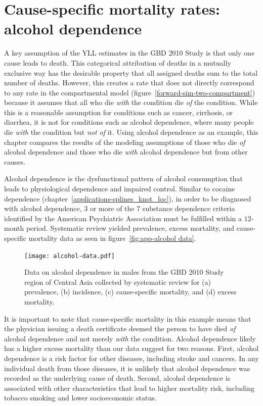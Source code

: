 \chapter{Cause-specific mortality rates: alcohol dependence}
\label{applications-csmr}

A key assumption of the YLL estimates in the GBD 2010 Study is that only
one cause leads to death.  This categorical attribution of deaths in
a mutually exclusive way has the desirable property that all assigned
deaths sum to the total number of deaths.  However, this
creates a rate that does not directly correspond to any rate in the
compartmental model (figure~\ref{forward-sim-two-compartment}) because it
assumes that all who die \emph{with} the condition die \emph{of} the
condition.  While this is a reasonable assumption for conditions
such as cancer, cirrhosis, or diarrhea, it is not for conditions such as
alcohol dependence, where many people die \emph{with}
the condition but \emph{not of} it.  Using alcohol dependence as an
example, this chapter compares the results of
the modeling assumptions of those who die \emph{of} alcohol dependence
and those who die \emph{with} alcohol dependence but from other causes.

Alcohol dependence is the dysfunctional pattern of alcohol consumption
that leads to physiological dependence and impaired control.  Similar to
cocaine dependence (chapter~\ref{applications-splines_knot_loc}), in order to
be diagnosed with alcohol dependence, $3$ or more of the $7$
substance dependence criteria identified by the American Psychiatric
Association must be
fulfilled within a $12$-month period.
\cite{american_psychiatric_association_diagnostic_2000, hasin_prevalence_2007}
Systematic review yielded prevalence, excess mortality, and
cause-specific mortality data as seen in figure~\ref{fig:app-alcohol
  data}.

    \begin{figure}[h]
        \begin{center}
            \texttt{[image: alcohol-data.pdf]}
            \caption{Data on alcohol
              dependence in males from the GBD 2010 Study region of
              Central Asia collected by systematic review for (a) prevalence, (b) incidence, (c)
              cause-specific mortality, and (d) excess mortality.}
            \label{fig:app-alcohol data}
        \end{center}
    \end{figure}

It is important to note that cause-specific mortality in this example
means that the physician issuing a death certificate deemed the person
to have died \emph{of} alcohol dependence and not merely \emph{with} the
condition.  Alcohol dependence likely has a higher excess mortality
than our data suggest for two reasons.  First, alcohol dependence is
a risk factor for other diseases, including stroke and cancers.  In
any individual death from those diseases, it is unlikely that alcohol
dependence was recorded as the underlying cause of
death.\cite{TK_citation_needed} Second, alcohol dependence is
associated with other characteristics that lead to higher mortality
risk, including tobacco smoking and lower socioeconomic
status.\cite{TK_citation_needed}

